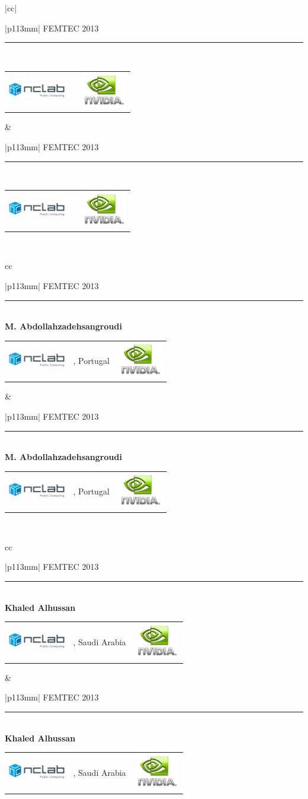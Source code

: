 \documentclass[letterpaper, 12pt]{article}
\renewcommand\arraystretch{1}
\newcommand{\OneSideEmptyBadge}
{
	\begin{tabular}{|p{113mm}|}
		\hline
		\centering
		\vspace{5mm}
		{\huge FEMTEC 2013}\\
		\vspace{-2mm}\rule{70mm}{0.2mm}\\
		\vspace{23mm}
		\renewcommand{\arraystretch}{1.5}
		\begin{tabular}{cp{54mm}c}
			\multirow{3}{*}{{\includegraphics[width=25mm]{logo-nclab.png}}} &  & \multirow{3}{*}{\includegraphics[width=20mm]{logo-nvidia.png}}\\
			& \vspace{10mm} & \\
			\multicolumn{3}{c}{\centering \includegraphics[width=55mm]{logo-nstec.png}} \\
		\end{tabular}
		\vspace{2mm}
	\end{tabular}
}
\newcommand{\TwoSideEmptyBadge}
{
	\begin{tabular}{|cc|}
	\OneSideEmptyBadge&\OneSideEmptyBadge\\
	\end{tabular}
	\newline
}
\newcommand{\OneSideBadge}[4]
{
	\begin{tabular}{|p{113mm}|}
		\hline
		\centering
		\vspace{5mm}
		{\huge FEMTEC 2013}\\
		\vspace{-2mm}\rule{70mm}{0.2mm}\\
		\vspace{10mm}
		{\Huge \bf #1}\\
		\vspace{5mm}
		\renewcommand{\arraystretch}{1.5}
		\begin{tabular}{cp{54mm}c}
			\multirow{3}{*}{{\includegraphics[width=25mm]{logo-nclab.png}}} & \centering{\small #2} & \multirow{3}{*}{\includegraphics[width=20mm]{logo-nvidia.png}}\\
			& \centering{\small #3}, {\small #4} \vspace{5mm} & \\
			\multicolumn{3}{c}{\centering \includegraphics[width=55mm]{logo-nstec.png}} \\
		\end{tabular}
		\vspace{2mm}
	\end{tabular}
}
\newcommand{\TwoSideBadge}[4]
{
	\begin{tabular}{cc}
	\OneSideBadge{#1}{#2}{#3}{#4}&\OneSideBadge{#1}{#2}{#3}{#4}\\
	\end{tabular}
	\newline
}
\begin{document}
\pagestyle{empty}

\TwoSideEmptyBadge
\TwoSideBadge{\LARGE M. Abdollahzadehsangroudi}{University of Beira Interior}{Covilha}{Portugal}
\TwoSideBadge{Khaled Alhussan}{King Abdulaziz City for Science and Technology}{Riyadh}{Saudi Arabia}
\end{document}
